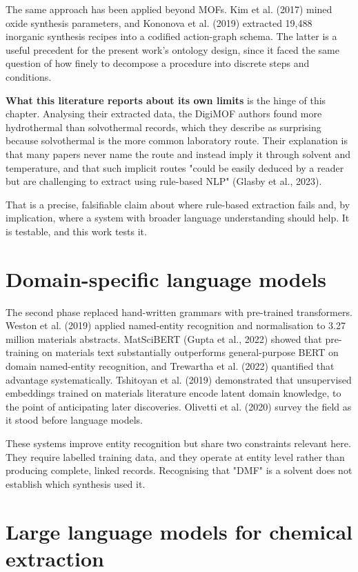 \documentclass[11pt,a4paper,oneside]{report}
\begin{document}
The same approach has been applied beyond MOFs. Kim et al. (2017) mined oxide synthesis parameters, and Kononova et al. (2019) extracted 19,488 inorganic synthesis recipes into a codified action-graph schema. The latter is a useful precedent for the present work's ontology design, since it faced the same question of how finely to decompose a procedure into discrete steps and conditions.

\textbf{What this literature reports about its own limits} is the hinge of this chapter. Analysing their extracted data, the DigiMOF authors found more hydrothermal than solvothermal records, which they describe as surprising because solvothermal is the more common laboratory route. Their explanation is that many papers never name the route and instead imply it through solvent and temperature, and that such implicit routes "could be easily deduced by a reader but are challenging to extract using rule-based NLP" (Glasby et al., 2023).

That is a precise, falsifiable claim about where rule-based extraction fails and, by implication, where a system with broader language understanding should help. It is testable, and this work tests it.

\section{Domain-specific language models}

The second phase replaced hand-written grammars with pre-trained transformers. Weston et al. (2019) applied named-entity recognition and normalisation to 3.27 million materials abstracts. MatSciBERT (Gupta et al., 2022) showed that pre-training on materials text substantially outperforms general-purpose BERT on domain named-entity recognition, and Trewartha et al. (2022) quantified that advantage systematically. Tshitoyan et al. (2019) demonstrated that unsupervised embeddings trained on materials literature encode latent domain knowledge, to the point of anticipating later discoveries. Olivetti et al. (2020) survey the field as it stood before language models.

These systems improve entity recognition but share two constraints relevant here. They require labelled training data, and they operate at entity level rather than producing complete, linked records. Recognising that "DMF" is a solvent does not establish which synthesis used it.

\section{Large language models for chemical extraction}
\end{document}
